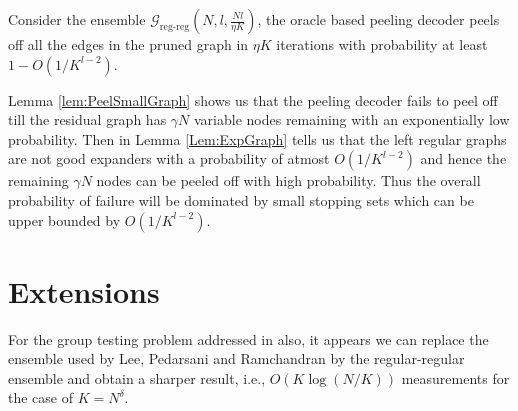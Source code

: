 \documentclass[conference,onecolumn]{IEEEtran}
\begin{document}
\begin{theorem}
Consider the ensemble $\mathcal{G}_{\text{reg-reg}}(N,l,\frac{Nl}{\eta K})$, the oracle based peeling decoder peels off all the edges in the pruned graph in $\eta K$ iterations with probability at least $1-O\left(1/K^{l-2}\right)$.
\end{theorem}
\begin{IEEEproof}
 Lemma \ref{lem:PeelSmallGraph} shows us that the peeling decoder fails to peel off till the residual graph has $\gamma N$ variable nodes remaining with an exponentially low probability. Then in Lemma \ref{Lem:ExpGraph} tells us that the left regular graphs are not good expanders with a probability of atmost $O(1/K^{l-2})$ and hence the remaining $\gamma N$ nodes can be peeled off with high probability. Thus the overall probability of failure will be dominated by small stopping sets which can be upper bounded by $O(1/K^{l-2})$.
\end{IEEEproof}
\vspace{3ex}


\section{Extensions} %
%
%

For the group testing problem addressed in \cite{lee2015saffron} also, it appears we can replace the ensemble used by Lee, Pedarsani and Ramchandran by the regular-regular ensemble and obtain a sharper result, i.e., $O(K \log (N/K))$ measurements for the case of $K = N^\delta$.
\end{document}
